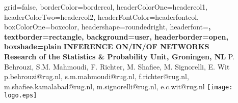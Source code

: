 \documentclass[a0paper,portrait]{baposter}
\begin{document}

\begin{poster}{
grid=false,
borderColor=bordercol, %
headerColorOne=headercol1, %
headerColorTwo=headercol2, %
headerFontColor=headerfontcol, %
boxColorOne=boxcolor, %
headershape=roundedright, %
headerfont=\Large\sf\bf, %
textborder=rectangle,
background=user,
headerborder=open, %
boxshade=plain
}
{}
%
%
{\sf\bf  INFERENCE ON/IN/OF NETWORKS \\ {\small Research of the Statistics \& Probability Unit, Groningen, NL}} %
{\vspace{1em} P. Behrouzi, S.M. Mahmoudi, F. Richter, M. Shafiee, M. Signorelli, E. Wit \\ %
{\footnotesize p.behrouzi@rug.nl, s.m.mahmoudi@rug.nl, f.richter@rug.nl, m.shafiee.kamalabad@rug.nl, m.signorelli@rug.nl, e.c.wit@rug.nl}} %
{\texttt{[image: logo.eps]}} %


\end{poster}
\end{document}
